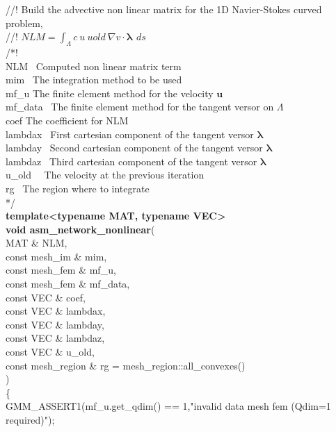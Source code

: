 \documentclass[a4paper]{report}
\newcommand\tab[1][1cm]{\hspace*{#1}}
\begin{document}
{\selectfont
//! Build the advective non linear matrix for the 1D Navier-Stokes curved \\ \tab \tab problem,\\
//! $ NLM = \int_{\Lambda} c~u~uold~\nabla v \cdot \mathbf{\lambda}\,~ds $\\
/*!\\
\tab	NLM  \tab \,     Computed non linear matrix term\\
\tab	 mim   \tab \, The integration method to be used\\
\tab	mf\_\-u \tab     The finite element method for the velocity $ \mathbf{u} $\\
\tab	mf\_\-data \,    The finite element method for the tangent versor on $ \Lambda $\\
\tab	coef   \tab   The coefficient for NLM\\
\tab	lambdax \,   First cartesian component of the tangent versor  $ \mathbf{\lambda} $\\
\tab	lambday \,   Second cartesian component of the tangent versor $ \mathbf{\lambda} $\\
\tab	lambdaz \,   Third cartesian component of the tangent versor $ \mathbf{\lambda}$\\
\tab	u\_\-old \, \,      The velocity at the previous iteration\\
\tab	rg    \tab  \,    The region where to integrate\\
 */\\
\textbf{template<typename MAT, typename VEC>\\
void asm\_\-network\_\-nonlinear}(\\
\tab	MAT \& NLM,\\
\tab	 const mesh\_\-im \& mim,\\
\tab	 const mesh\_\-fem \& mf\_\-u,\\
\tab	 const mesh\_\-fem \& mf\_\-data,\\
\tab	 const VEC \& coef,\\
\tab	 const VEC \& lambdax,\\ \tab const VEC \& lambday,\\ \tab  const VEC \& lambdaz,\\
\tab	 const VEC \& u\_\-old,\\
\tab	 const mesh\_\-region \& rg = mesh\_\-region::all\_\-convexes()\\
\tab	 ) 		\\
\{\\
\tab	GMM\_\-ASSERT1(mf\_\-u.get\_\-qdim() == 1,"invalid data mesh fem (Qdim=1 required)");\\
}
\end{document}
